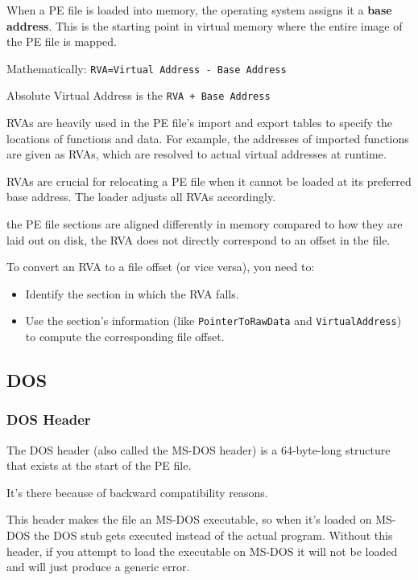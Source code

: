 When a PE file is loaded into memory, the operating system assigns it a {\bf base address}. This is the starting point in virtual memory where the entire image of the PE file is mapped.

Mathematically: \verb+RVA=Virtual Address - Base Address+

Absolute Virtual Address is the \verb-RVA + Base Address-

RVAs are heavily used in the PE file's import and export tables to specify the locations of functions and data. For example, the addresses of imported functions are given as RVAs, which are resolved to actual virtual addresses at runtime.

RVAs are crucial for relocating a PE file when it cannot be loaded at its preferred base address. The loader adjusts all RVAs accordingly.

the PE file sections are aligned differently in memory compared to how they are laid out on disk, the RVA does not directly correspond to an offset in the file. 

To convert an RVA to a file offset (or vice versa), you need to:
\begin{itemize}
    \item Identify the section in which the RVA falls.
    \item Use the section's information (like \verb+PointerToRawData+ and \verb+VirtualAddress+) to compute the corresponding file offset.
\end{itemize}


\subsection{DOS}

\subsubsection{DOS Header}
The DOS header (also called the MS-DOS header) is a 64-byte-long structure that exists at the start of the PE file.

It’s there because of backward compatibility reasons. 

This header makes the file an MS-DOS executable, so when it’s loaded on MS-DOS the DOS stub gets executed instead of the actual program.
Without this header, if you attempt to load the executable on MS-DOS it will not be loaded and will just produce a generic error.

